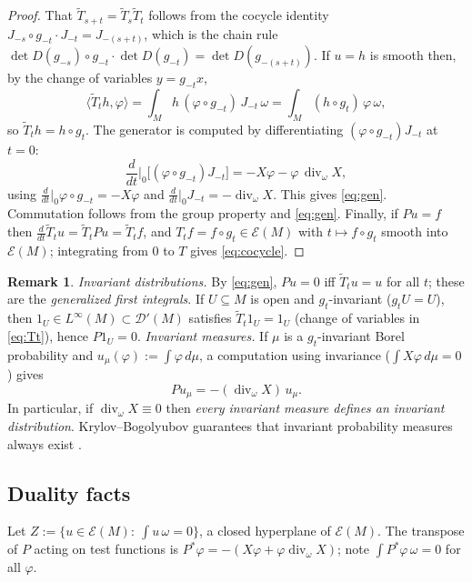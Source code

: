 \documentclass[11pt]{amsart}
\theoremstyle{plain}
\theoremstyle{definition}
\newtheorem{remark}[theorem]{Remark}
\theoremstyle{remark}
\newcommand{\DD}{\mathcal{D}'}
\newcommand{\EE}{\mathcal{E}}
\newcommand{\flow}{g_t}
\begin{document}
\begin{proof}
That $\widetilde T_{s+t}=\widetilde T_s\widetilde T_t$ follows from the
cocycle identity $J_{-s}\circ g_{-t}\cdot J_{-t}=J_{-(s+t)}$, which is
the chain rule $\det D(g_{-s})\circ g_{-t}\cdot \det D(g_{-t})
=\det D(g_{-(s+t)})$.  If $u=h$ is smooth then, by the change of
variables $y=g_{-t}x$,
\[
\langle \widetilde T_t h,\varphi\rangle
=\int_M h\,(\varphi\circ g_{-t})\,J_{-t}\,\omega
=\int_M (h\circ g_t)\,\varphi\,\omega ,
\]
so $\widetilde T_t h=h\circ g_t$.  The generator is computed by
differentiating $(\varphi\circ g_{-t})J_{-t}$ at $t=0$:
\[
\frac d{dt}\Big|_{0}\bigl[(\varphi\circ g_{-t})J_{-t}\bigr]
=-X\varphi-\varphi\,\operatorname{div}_\omega X,
\]
using $\frac d{dt}\big|_0\varphi\circ g_{-t}=-X\varphi$ and
$\frac d{dt}\big|_0 J_{-t}=-\operatorname{div}_\omega X$.  This gives
\eqref{eq:gen}.  Commutation follows from the group property and
\eqref{eq:gen}.  Finally, if $Pu=f$ then
$\frac d{dt}\widetilde T_tu=\widetilde T_tPu=\widetilde T_tf$, and
$T_tf=f\circ g_t\in \EE(M)$ with $t\mapsto f\circ g_t$ smooth into
$\EE(M)$; integrating from $0$ to $T$ gives \eqref{eq:cocycle}.
\end{proof}

\begin{remark}\label{r:kernels}
\emph{Invariant distributions.}  By \eqref{eq:gen},
$Pu=0$ iff $\widetilde T_tu=u$ for all $t$; these are the
\emph{generalized first integrals}.  If $U\subseteq M$ is open and
$\flow$-invariant ($g_tU=U$), then $1_U\in L^\infty(M)\subset\DD(M)$
satisfies $\widetilde T_t 1_U=1_U$ (change of variables in
\eqref{eq:Tt}), hence $P1_U=0$.
\emph{Invariant measures.}  If $\mu$ is a $\flow$-invariant Borel
probability and $u_\mu(\varphi):=\int\varphi\,d\mu$, a computation
using invariance ($\int X\varphi\,d\mu=0$) gives
\begin{equation}\label{eq:Pmu}
P u_\mu = -(\operatorname{div}_\omega X)\,u_\mu .
\end{equation}
In particular, if $\operatorname{div}_\omega X\equiv0$ then
\emph{every invariant measure defines an invariant distribution}.
Krylov--Bogolyubov guarantees that invariant probability measures
always exist \cite[Th.~4.1.1]{Walters}.
\end{remark}

\subsection{Duality facts}

Let $Z:=\{u\in \EE(M):\ \int u\,\omega=0\}$, a closed hyperplane of
$\EE(M)$.  The transpose of $P$ acting on test functions is
$P^*\varphi=-(X\varphi+\varphi\operatorname{div}_\omega X)$; note
$\int P^*\varphi\,\omega=0$ for all $\varphi$.
\end{document}
